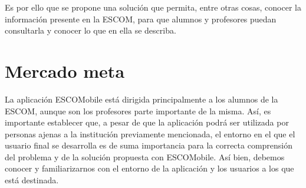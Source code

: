 \noindent 
\newline
Es por ello que se propone una solución que permita, entre otras cosas, conocer la información presente en la ESCOM, para que alumnos y profesores puedan consultarla y conocer lo que en ella se describa. 

\section{Mercado meta}

\noindent
La aplicación ESCOMobile está dirigida principalmente a los alumnos de la ESCOM, aunque son los profesores parte importante de la misma. Así, es importante establecer que, a pesar de que la aplicación podrá ser utilizada por personas ajenas a la institución previamente mencionada, el entorno en el que el usuario final se desarrolla es de suma importancia para la correcta comprensión del problema y de la solución propuesta con ESCOMobile. Así bien, debemos conocer y familiarizarnos con el entorno de la aplicación y los usuarios a los que está destinada. 
